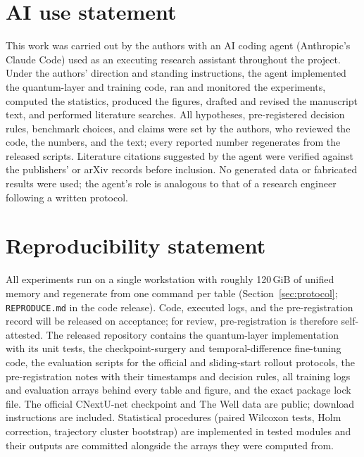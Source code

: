 
\section*{AI use statement}
This work was carried out by the authors with an AI coding agent (Anthropic's
Claude Code) used as an executing research assistant throughout the project.
Under the authors' direction and standing instructions, the agent implemented
the quantum-layer and training code, ran and monitored the experiments,
computed the statistics, produced the figures, drafted and
revised the manuscript text, and performed literature searches. All hypotheses,
pre-registered decision rules, benchmark choices, and claims were set by the
authors, who reviewed the code, the numbers, and the text; every reported number
regenerates from the released scripts. Literature citations suggested by the
agent were verified against the publishers' or arXiv records before inclusion.
No generated data or fabricated results were used; the agent's role is
analogous to that of a research engineer following a written protocol.

\section*{Reproducibility statement}
All experiments run on a single workstation with roughly 120\,GiB of unified
memory and regenerate from one command per table (Section~\ref{sec:protocol};
\texttt{REPRODUCE.md} in the code release). Code, executed logs, and the
pre-registration record will be released on acceptance; for review,
pre-registration is therefore self-attested. The released repository contains
the quantum-layer implementation with its unit tests, the checkpoint-surgery
and temporal-difference fine-tuning code, the evaluation scripts for the official
and sliding-start rollout protocols, the pre-registration notes with their
timestamps and decision rules, all training logs and evaluation arrays behind
every table and figure, and the exact package lock file. The official CNextU-net
checkpoint and The Well data are public; download instructions are included.
Statistical procedures (paired Wilcoxon tests, Holm correction, trajectory
cluster bootstrap) are implemented in tested modules and their outputs are
committed alongside the arrays they were computed from.
